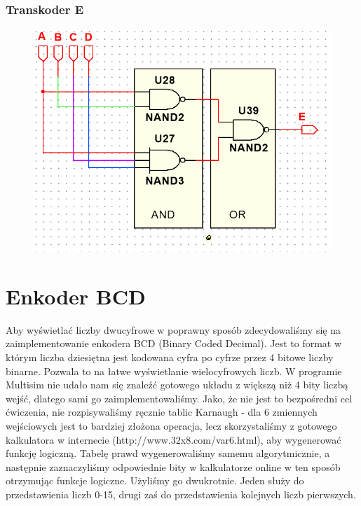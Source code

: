 \documentclass[a4paper]{article}
\begin{document}
\subsubsection{Transkoder E}
\begin{figure}[H]
 \centering
 \includegraphics{schemat_E.png}
\end{figure}
\section{Enkoder BCD}
Aby wyświetlać liczby dwucyfrowe w poprawny sposób zdecydowaliśmy się na zaimplementowanie enkodera BCD (Binary Coded Decimal). Jest to format
w którym liczba dziesiętna jest kodowana cyfra po cyfrze przez 4 bitowe liczby binarne. Pozwala to na łatwe wyświetlanie wielocyfrowych liczb.
W programie Multisim nie udało nam się znaleźć gotowego układu z większą niż 4 bity liczbą wejść, dlatego sami go zaimplementowaliśmy. Jako, że 
nie jest to bezpośredni cel ćwiczenia, nie rozpisywaliśmy ręcznie tablic Karnaugh - dla 6 zmiennych wejściowych jest to bardziej złożona operacja, lecz
skorzystaliśmy z gotowego kalkulatora w internecie (http://www.32x8.com/var6.html), aby wygenerować funkcję logiczną. Tabelę prawd wygenerowaliśmy samemu algorytmicznie, a następnie
zaznaczyliśmy odpowiednie bity w kalkulatorze online w ten sposób otrzymując funkcje logiczne. Użyliśmy go dwukrotnie. Jeden służy do przedstawienia liczb 0-15,
 drugi zaś do przedstawienia kolejnych liczb pierwszych. 
\end{document}
